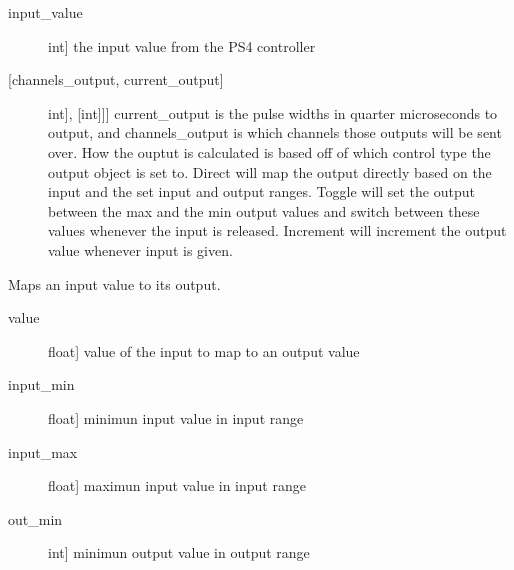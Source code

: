 \documentclass[letterpaper,10pt,english]{sphinxmanual}
\begin{document}
\begin{fulllineitems}
\begin{fulllineitems}
\begin{description}
\item[{input\_value}] \leavevmode{[}int{]}
\sphinxAtStartPar
the input value from the PS4 controller

\end{description}

\sphinxAtStartPar
{}
\begin{description}
\item[{{[}channels\_output, current\_output{]}}] \leavevmode{[}{[}{[}int{]}, {[}int{]}{]}{]}
\sphinxAtStartPar
current\_output is the pulse widths in quarter microseconds to output, and channels\_output
is which channels those outputs will be sent over. How the ouptut is calculated is based
off of which control type the output object is set to. Direct will map the output directly
based on the input and the set input and output ranges. Toggle will set the output between
the max and the min output values and switch between these values whenever the input is
released. Increment will increment the output value whenever input is given.

\end{description}

\end{fulllineitems}


\begin{fulllineitems}
\label{\detokenize{generic:AnalogMixerOutput.AnalogMixerOutput.map_values}}
\sphinxAtStartPar
Maps an input value to its output.

\sphinxAtStartPar
{}
\begin{description}
\item[{value}] \leavevmode{[}float{]}
\sphinxAtStartPar
value of the input to map to an output value

\item[{input\_min}] \leavevmode{[}float{]}
\sphinxAtStartPar
minimun input value in input range

\item[{input\_max}] \leavevmode{[}float{]}
\sphinxAtStartPar
maximun input value in input range

\item[{out\_min}] \leavevmode{[}int{]}
\sphinxAtStartPar
minimun output value in output range


\end{description}
\end{fulllineitems}
\end{fulllineitems}
\end{document}

